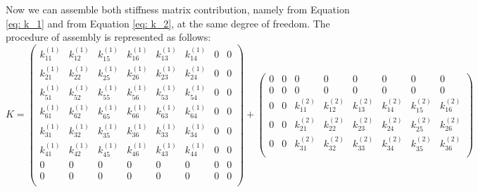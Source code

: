 Now we can assemble both stiffness matrix contribution, namely from Equation \ref{eq: k_1} and from Equation \ref{eq: k_2}, at the same degree of freedom.  The procedure of assembly is represented as follows:
\begin{equation*}
K = \begin{pmatrix}
k_{11}^{\left(1\right)} & k_{12}^{\left(1\right)} &  k_{15}^{\left(1\right)} &  k_{16}^{\left(1\right)} & k_{13}^{\left(1\right)}  & k_{14}^{\left(1\right)} & 0 & 0   \\[0.3em]
k_{21}^{\left(1\right)} & k_{22}^{\left(1\right)} &  k_{25}^{\left(1\right)} &  k_{26}^{\left(1\right)} & k_{23}^{\left(1\right)}  & k_{24}^{\left(1\right)} & 0 & 0   \\[0.3em]
k_{51}^{\left(1\right)} & k_{52}^{\left(1\right)} &  k_{55}^{\left(1\right)} &  k_{56}^{\left(1\right)} & k_{53}^{\left(1\right)}  & k_{54}^{\left(1\right)} & 0 & 0   \\[0.3em]
k_{61}^{\left(1\right)} & k_{62}^{\left(1\right)} &  k_{65}^{\left(1\right)} &  k_{66}^{\left(1\right)} & k_{63}^{\left(1\right)}  & k_{64}^{\left(1\right)}  & 0 & 0  \\[0.3em]
k_{31}^{\left(1\right)} & k_{32}^{\left(1\right)} &  k_{35}^{\left(1\right)} &  k_{36}^{\left(1\right)} & k_{33}^{\left(1\right)}  & k_{34}^{\left(1\right)}  & 0 & 0  \\[0.3em]
k_{41}^{\left(1\right)} & k_{42}^{\left(1\right)} &  k_{45}^{\left(1\right)} &  k_{46}^{\left(1\right)} & k_{43}^{\left(1\right)}  & k_{44}^{\left(1\right)}  & 0 & 0  \\[0.3em]
0 & 0 & 0 & 0 & 0 & 0 & 0 & 0 \\[0.3em]
0 & 0 & 0 & 0 & 0 & 0 & 0 & 0 \\[0.3em]
\end{pmatrix} + \begin{pmatrix}
0 & 0 & 0 & 0 & 0 & 0 & 0 & 0 \\[0.3em]
0 & 0 & 0 & 0 & 0 & 0 & 0 & 0 \\[0.3em]
0 & 0 &k_{11}^{\left(2\right)} & k_{12}^{\left(2\right)} &  k_{13}^{\left(2\right)} &  k_{14}^{\left(2\right)} & k_{15}^{\left(2\right)}  & k_{16}^{\left(2\right)}   \\[0.3em]
0 & 0 & k_{21}^{\left(2\right)} & k_{22}^{\left(2\right)} &  k_{23}^{\left(2\right)} &  k_{24}^{\left(2\right)} & k_{25}^{\left(2\right)}  & k_{26}^{\left(2\right)}   \\[0.3em]
0 & 0 & k_{31}^{\left(2\right)} & k_{32}^{\left(2\right)} &  k_{33}^{\left(2\right)} &  k_{34}^{\left(2\right)} & k_{35}^{\left(2\right)}  & k_{36}^{\left(2\right)}    \\[0.3em]

\end{pmatrix}
\end{equation*}
